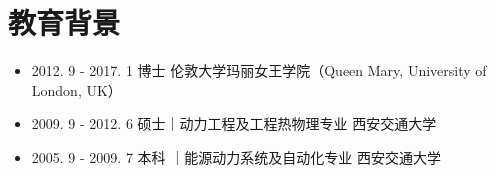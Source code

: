 \documentclass[letterpaper]{article}
\begin{document}

\vspace{-12pt}
\section*{教育背景}
\vspace{-10pt}
\begin{itemize}
  \item 2012. 9 - 2017. 1 \hspace{2pt} 博士  伦敦大学玛丽女王学院（Queen Mary, University of London, UK）
  \item 2009. 9 - 2012. 6 \hspace{2pt} 硕士｜动力工程及工程热物理专业 西安交通大学
  \item 2005. 9 - 2009. 7 \hspace{2pt} 本科 ｜能源动力系统及自动化专业 西安交通大学
\end{itemize}
\end{document}
